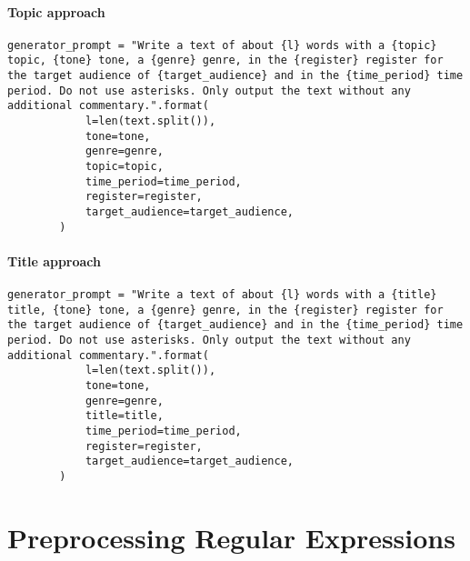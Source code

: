 \paragraph{Topic approach}
\begin{verbatim}
generator_prompt = "Write a text of about {l} words with a {topic} topic, {tone} tone, a {genre} genre, in the {register} register for the target audience of {target_audience} and in the {time_period} time period. Do not use asterisks. Only output the text without any additional commentary.".format(
            l=len(text.split()),
            tone=tone,
            genre=genre,
            topic=topic,
            time_period=time_period,
            register=register,
            target_audience=target_audience,
        )
\end{verbatim}

\paragraph{Title approach}
\begin{verbatim}
generator_prompt = "Write a text of about {l} words with a {title} title, {tone} tone, a {genre} genre, in the {register} register for the target audience of {target_audience} and in the {time_period} time period. Do not use asterisks. Only output the text without any additional commentary.".format(
            l=len(text.split()),
            tone=tone,
            genre=genre,
            title=title,
            time_period=time_period,
            register=register,
            target_audience=target_audience,
        )
\end{verbatim}

\section{Preprocessing Regular Expressions}
\label{app:regex_preproc}

